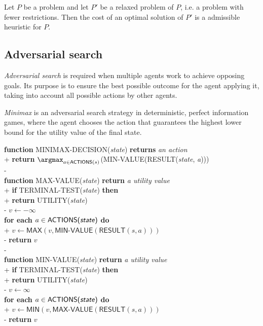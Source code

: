 \documentclass{article}
\begin{document}
\begin{theorem}
    Let $P$ be a problem and let $P'$ be a relaxed problem of $P$, i.e.
    a problem with fewer restrictions. Then the cost of an optimal solution of
    $P'$ is a admissible heuristic for $P$.
\end{theorem}


\subsection{Adversarial search}


\begin{definition}[R\&N p. 161]
    \emph{Adversarial search} is required when multiple agents work to achieve
    opposing goals. Its purpose is to ensure the best possible outcome for the
    agent applying it, taking into account all possible actions by other agents.
\end{definition}

\begin{definition}[R\&N p. 165]
    \emph{Minimax} is an adversarial search strategy in deterministic, perfect
    information games, where the agent chooses the action that guarantees the
    highest lower bound for the utility value of the final state.

    \begin{pseudo}
        \textbf{function} MINIMAX-DECISION(\emph{state}) \textbf{returns} \emph{an action}\\+
        \textbf{return} $\argmax_{a\in\textsf{ACTIONS}(s)}$(MIN-VALUE(RESULT(\emph{state}, \emph{a})))\\-
        \\
        \textbf{function} MAX-VALUE(\emph{state}) \textbf{return} \emph{a utility value}\\+
        \textbf{if} TERMINAL-TEST(\emph{state}) \textbf{then}\\+
        \textbf{return} UTILITY(\emph{state})\\-
        $v\leftarrow-\infty$\\
        \textbf{for each} $a\in\textsf{ACTIONS(\emph{state})}$ \textbf{do}\\+
        $v\leftarrow \textsf{MAX}(v, \textsf{MIN-VALUE}(\textsf{RESULT}(s, a)))$\\-
        \textbf{return} $v$\\-
        \\
        \textbf{function} MIN-VALUE(\emph{state}) \textbf{return} \emph{a utility value}\\+
        \textbf{if} TERMINAL-TEST(\emph{state}) \textbf{then}\\+
        \textbf{return} UTILITY(\emph{state})\\-
        $v\leftarrow\infty$\\
        \textbf{for each} $a\in\textsf{ACTIONS(\emph{state})}$ \textbf{do}\\+
        $v\leftarrow \textsf{MIN}(v, \textsf{MAX-VALUE}(\textsf{RESULT}(s, a)))$\\-
        \textbf{return} $v$
    \end{pseudo}
\end{definition}
\end{document}
